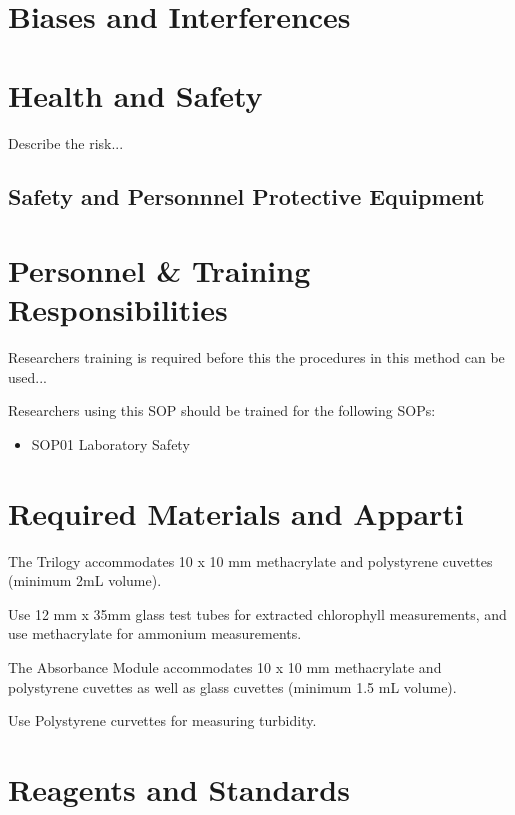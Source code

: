 \documentclass[12pt]{../SOP4_alpha}\usepackage[]{graphicx}\usepackage[]{color}
\begin{document}
\section{Biases and Interferences}



\section{Health and Safety}

\NP Describe the risk...


\subsection{Safety and Personnnel Protective Equipment}

\section{Personnel \& Training Responsibilities}

\NP Researchers training is required before this the procedures in this method can be used... 

\NP Researchers using this SOP should be trained for the following SOPs:

\begin{itemize}
  \item SOP01 Laboratory Safety
\end{itemize}

\section{Required Materials and Apparti}

\NP The Trilogy accommodates 10 x 10 mm methacrylate and polystyrene cuvettes (minimum 2mL volume). 

\NP Use 12 mm x 35mm glass test tubes for extracted chlorophyll measurements, and use methacrylate for ammonium measurements.

\NP The Absorbance Module accommodates 10 x 10 mm methacrylate and polystyrene cuvettes as well as glass cuvettes (minimum 1.5 mL volume).

\NP Use Polystyrene curvettes for measuring turbidity.

\section{Reagents and Standards}
\end{document}
